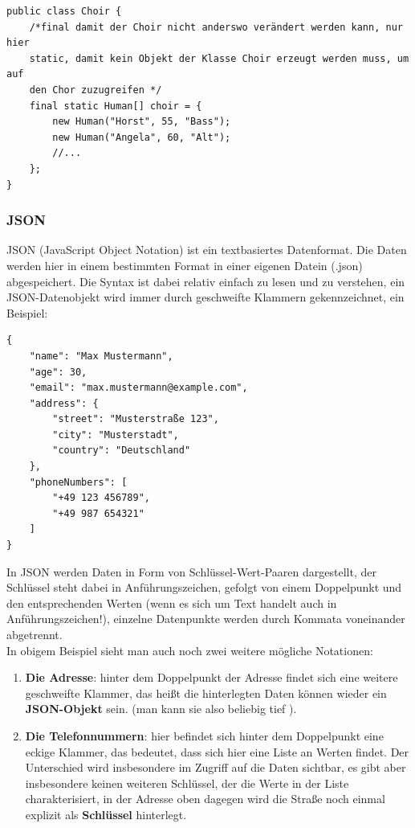 \documentclass{article}
\begin{document}
\begin{verbatim}
public class Choir {
    /*final damit der Choir nicht anderswo verändert werden kann, nur hier
    static, damit kein Objekt der Klasse Choir erzeugt werden muss, um auf 
    den Chor zuzugreifen */
    final static Human[] choir = {
        new Human("Horst", 55, "Bass");
        new Human("Angela", 60, "Alt");
        //...
    };
}
\end{verbatim}

\subsubsection{JSON}

JSON (JavaScript Object Notation) ist ein textbasiertes Datenformat. Die Daten werden hier in einem bestimmten Format in einer eigenen Datein (.json) abgespeichert. Die Syntax ist dabei relativ einfach zu lesen und zu verstehen, ein JSON-Datenobjekt wird immer durch geschweifte Klammern gekennzeichnet, ein Beispiel: 
\begin{verbatim}
{
    "name": "Max Mustermann",
    "age": 30,
    "email": "max.mustermann@example.com",
    "address": {
        "street": "Musterstraße 123",
        "city": "Musterstadt",
        "country": "Deutschland"
    },
    "phoneNumbers": [
        "+49 123 456789",
        "+49 987 654321"
    ]
}     
\end{verbatim}
In JSON werden Daten in Form von Schlüssel-Wert-Paaren dargestellt, der Schlüssel steht dabei in Anführungszeichen, gefolgt von einem Doppelpunkt und den entsprechenden Werten (wenn es sich um Text handelt auch in Anführungszeichen!), einzelne Datenpunkte werden durch Kommata voneinander abgetrennt.  \\
In obigem Beispiel sieht man auch noch zwei weitere mögliche Notationen:
\begin{enumerate}
    \item \textbf{Die Adresse}: hinter dem Doppelpunkt der Adresse findet sich eine weitere geschweifte Klammer, das heißt die hinterlegten Daten können wieder ein \textbf{JSON-Objekt} sein. (man kann sie also beliebig tief ).
    \item \textbf{Die Telefonnummern}: hier befindet sich hinter dem Doppelpunkt eine eckige Klammer, das bedeutet, dass sich hier eine Liste an Werten findet. Der Unterschied wird insbesondere im Zugriff auf die Daten sichtbar, es gibt aber insbesondere keinen weiteren Schlüssel, der die Werte in der Liste charakterisiert, in der Adresse oben dagegen wird die Straße noch einmal explizit als \textbf{Schlüssel} hinterlegt.  
\end{enumerate}
\end{document}

